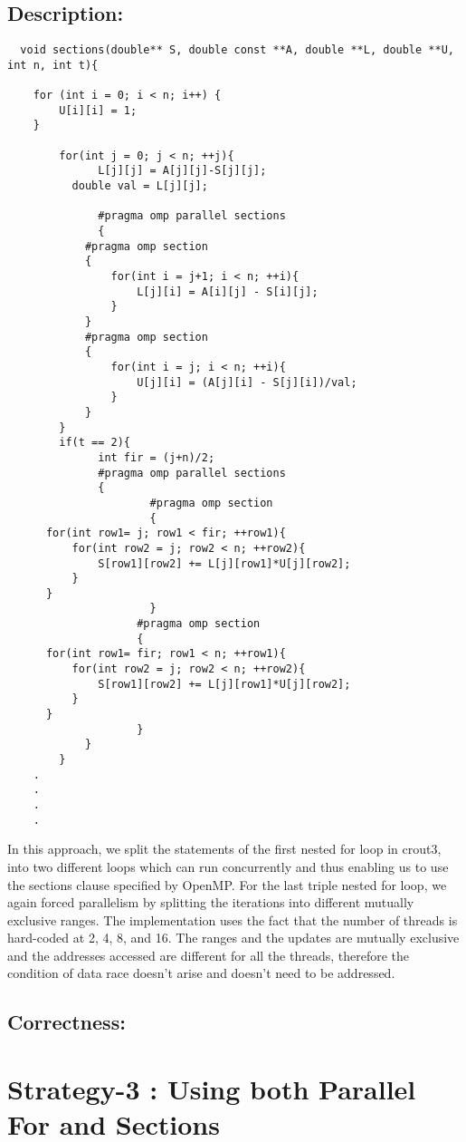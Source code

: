 \documentclass[12pt]{article}
\begin{document}
\subsection*{Description:}

\begin{verbatim}
  void sections(double** S, double const **A, double **L, double **U, int n, int t){

    for (int i = 0; i < n; i++) {
        U[i][i] = 1;
    }

	    for(int j = 0; j < n; ++j){
		      L[j][j] = A[j][j]-S[j][j];
          double val = L[j][j];
          
		      #pragma omp parallel sections
		      {
            #pragma omp section
            {
                for(int i = j+1; i < n; ++i){
                    L[j][i] = A[i][j] - S[i][j];
                }
            }
            #pragma omp section
            {
                for(int i = j; i < n; ++i){
                    U[j][i] = (A[j][i] - S[j][i])/val;
                }
            }
		}
		if(t == 2){
			  int fir = (j+n)/2;
			  #pragma omp parallel sections
			  {
					  #pragma omp section
					  {
      for(int row1= j; row1 < fir; ++row1){
          for(int row2 = j; row2 < n; ++row2){
              S[row1][row2] += L[j][row1]*U[j][row2];
          }
      }
					  }
					#pragma omp section
					{
      for(int row1= fir; row1 < n; ++row1){
          for(int row2 = j; row2 < n; ++row2){
              S[row1][row2] += L[j][row1]*U[j][row2];
          }
      }
					}
			}
		}
    .
    .
    .
    .
\end{verbatim}

In this approach, we split the statements of the first nested for loop in crout3, into two different loops which can run concurrently and
thus enabling us to use the sections clause specified by OpenMP. For the last triple nested for loop, we again forced parallelism by
splitting the iterations into different mutually exclusive ranges. The implementation uses the fact that the number of threads is hard-coded at
2, 4, 8, and 16. The ranges and the updates are mutually exclusive and the addresses accessed are different for all the threads, therefore the condition
of data race doesn't arise and doesn't need to be addressed.

\subsection*{Correctness:}

\section*{Strategy-3 : Using both Parallel For and Sections}
\end{document}

